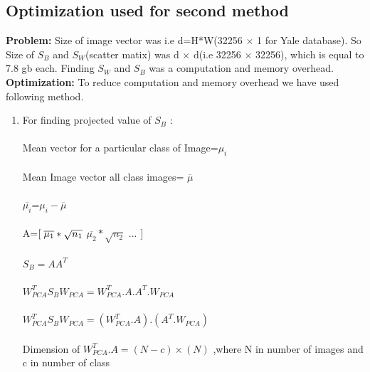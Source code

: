 \documentclass[a4paper,10pt]{report}
\begin{document}
\subsection{Optimization used for second method}
\textbf{Problem:} Size of image vector was i.e d=H*W(32256 $\times$ 1 for Yale database). So Size of $S_B$ and $S_W$(scatter matix) was d $\times$ d(i.e 32256 $\times$ 32256), 
which is equal to 7.8 gb each. Finding $S_W$ and $S_B$ was a computation and memory overhead. \\
\textbf{Optimization:} To reduce computation and memory overhead we have used following method.\\
\begin{enumerate}
 \item For finding projected value of $S_B$ :\\ \\
 Mean vector for a particular class of Image=$\mu_i$\\ \\
 Mean Image vector all class images= $\overline{\mu}$\\ \\
 $\overline{\mu_i}$=$\mu_i-\overline{\mu}$\\ \\
 A=$[\hspace{0.1cm} \overline{\mu_1}*\sqrt{n_1}$  \hspace{0.2cm}   $\overline{\mu_2}*\sqrt{n_2} $ \hspace{0.2cm}... $ ] $\\ \\ 
 $S_B = AA^T$\\ \\ 
 $W_{PCA}^T S_B W_{PCA}= W_{PCA}^T.A.A^T.W_{PCA} $\\ \\
 $W_{PCA}^T S_B W_{PCA}= (W_{PCA}^T.A).(A^T.W_{PCA}) $ \\ \\
 Dimension of $W_{PCA}^T.A=(N-c) \times (N) $ ,where N in number of images and c in number of class \\ 
 

\end{enumerate}
\end{document}
